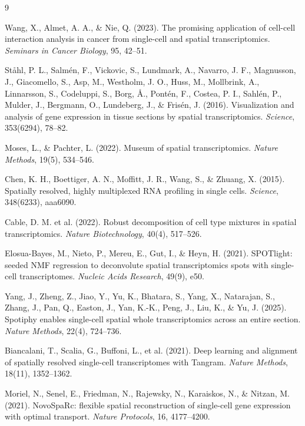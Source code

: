 \documentclass[10pt,a4paper]{article}
\begin{document}

\begin{thebibliography}{9}

Wang, X., Almet, A. A., \& Nie, Q. (2023). The promising application of cell-cell interaction analysis in cancer from single-cell and spatial transcriptomics. \emph{Seminars in Cancer Biology}, 95, 42–51.


Ståhl, P. L., Salmén, F., Vickovic, S., Lundmark, A., Navarro, J. F., Magnusson, J., Giacomello, S., Asp, M., Westholm, J. O., Huss, M., Mollbrink, A., Linnarsson, S., Codeluppi, S., Borg, Å., Pontén, F., Costea, P. I., Sahlén, P., Mulder, J., Bergmann, O., Lundeberg, J., \& Frisén, J. (2016). Visualization and analysis of gene expression in tissue sections by spatial transcriptomics. \emph{Science}, 353(6294), 78–82.

Moses, L., \& Pachter, L. (2022). Museum of spatial transcriptomics. \emph{Nature Methods}, 19(5), 534–546.

Chen, K. H., Boettiger, A. N., Moffitt, J. R., Wang, S., \& Zhuang, X. (2015). Spatially resolved, highly multiplexed RNA profiling in single cells. \emph{Science}, 348(6233), aaa6090.


Cable, D. M. et al. (2022). Robust decomposition of cell type mixtures in spatial transcriptomics. \emph{Nature Biotechnology}, 40(4), 517–526.

Elosua-Bayes, M., Nieto, P., Mereu, E., Gut, I., \& Heyn, H. (2021). SPOTlight: seeded NMF regression to deconvolute spatial transcriptomics spots with single-cell transcriptomes. \emph{Nucleic Acids Research}, 49(9), e50.

Yang, J., Zheng, Z., Jiao, Y., Yu, K., Bhatara, S., Yang, X., Natarajan, S., Zhang, J., Pan, Q., Easton, J., Yan, K.-K., Peng, J., Liu, K., \& Yu, J. (2025). Spotiphy enables single-cell spatial whole transcriptomics across an entire section. \emph{Nature Methods}, 22(4), 724–736.

Biancalani, T., Scalia, G., Buffoni, L., et al. (2021). Deep learning and alignment of spatially resolved single-cell transcriptomes with Tangram. \emph{Nature Methods}, 18(11), 1352–1362.

Moriel, N., Senel, E., Friedman, N., Rajewsky, N., Karaiskos, N., \& Nitzan, M. (2021). NovoSpaRc: flexible spatial reconstruction of single-cell gene expression with optimal transport. \emph{Nature Protocols}, 16, 4177–4200.


\end{thebibliography}
\end{document}
